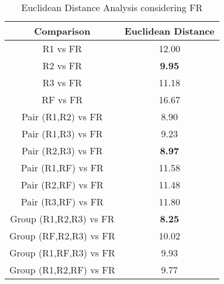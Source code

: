 \begin{table}[!ht]
\centering
\scriptsize
\caption{Euclidean Distance Analysis considering FR}
\label{tab:similarity-distance-FR-table}
\begin{tabular}{|c|c|}
\hline
\textbf{Comparison} & \textbf{Euclidean Distance} \\ \hline
R1 vs FR & 12.00 \\ \hline
R2 vs FR & \textbf{9.95} \\ \hline
R3 vs FR & 11.18 \\ \hline
RF vs FR & 16.67 \\ \hline
\hline
Pair (R1,R2) vs FR & 8.90 \\ \hline
Pair (R1,R3) vs FR & 9.23 \\ \hline
Pair (R2,R3) vs FR & \textbf{8.97} \\ \hline
Pair (R1,RF) vs FR & 11.58 \\ \hline
Pair (R2,RF) vs FR & 11.48 \\ \hline
Pair (R3,RF) vs FR & 11.80 \\ \hline
\hline
Group (R1,R2,R3) vs FR & \textbf{8.25}\\ \hline
Group (RF,R2,R3) vs FR & 10.02 \\ \hline
Group (R1,RF,R3) vs FR & 9.93 \\ \hline
Group (R1,R2,RF) vs FR & 9.77 \\ \hline
\end{tabular}
\end{table}